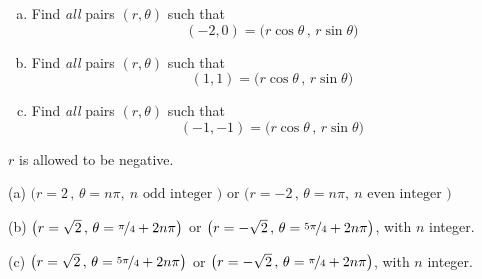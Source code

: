 \begin{question}
\begin{enumerate}[(a)]
\item
Find \emph{all} pairs $(r,\theta)$ such that
\begin{equation*}
(-2,0) = \big(r\cos\theta\,,\,r\sin\theta\big)
\end{equation*}
\item
Find \emph{all} pairs $(r,\theta)$ such that
\begin{equation*}
(1,1) = \big(r\cos\theta\,,\,r\sin\theta\big)
\end{equation*}
\item
Find \emph{all} pairs $(r,\theta)$ such that
\begin{equation*}
(-1,-1) = \big(r\cos\theta\,,\,r\sin\theta\big)
\end{equation*}
\end{enumerate}
\end{question}

\begin{hint} 
$r$ is allowed to be negative.
\end{hint}

\begin{answer} 
(a) $\big(r=2\,,\,\theta= n\pi,\ n\text{ odd integer }\big)$ or 
    $\big(r=-2\,,\,\theta= n\pi,\ n\text{ even integer }\big)$ 

(b) $\big(r=\sqrt{2}\,,\,\theta= \nicefrac{\pi}{4} + 2n\pi\big)$ or 
    $\big(r=-\sqrt{2}\,,\,\theta= \nicefrac{5\pi}{4} + 2n\pi\big)$,
    with $n$ integer. 

(c) $\big(r=\sqrt{2}\,,\,\theta= \nicefrac{5\pi}{4} + 2n\pi\big)$ or 
    $\big(r=-\sqrt{2}\,,\,\theta= \nicefrac{\pi}{4} + 2n\pi\big)$,
    with $n$ integer. 
\end{answer}


